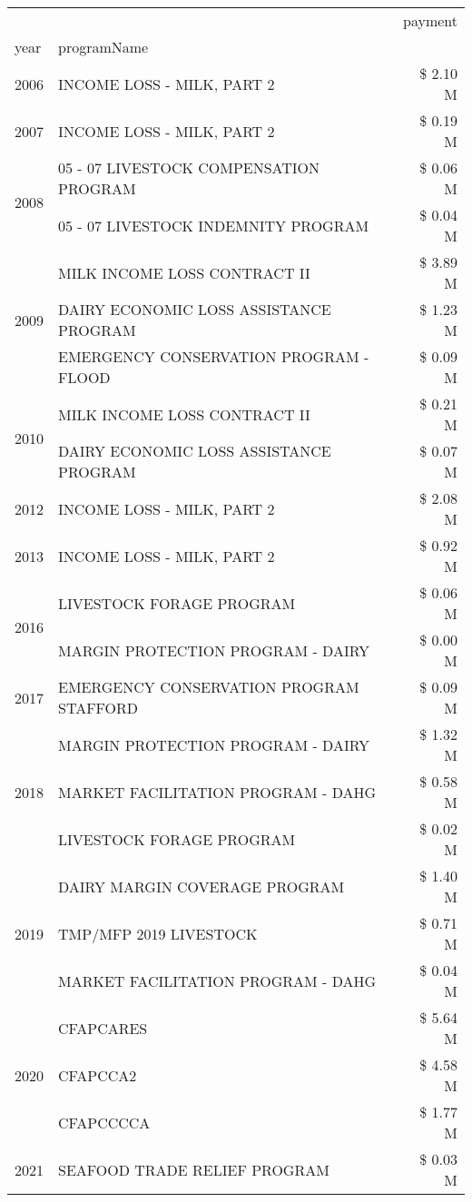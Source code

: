 \begin{tabular}{llr}
\toprule
 &  & payment \\
year & programName &  \\
\midrule
2006 & INCOME LOSS - MILK, PART 2 & \$ 2.10 M \\
\cline{1-3}
2007 & INCOME LOSS - MILK, PART 2 & \$ 0.19 M \\
\cline{1-3}
\multirow[t]{2}{*}{2008} & 05 - 07 LIVESTOCK COMPENSATION PROGRAM & \$ 0.06 M \\
 & 05 - 07 LIVESTOCK INDEMNITY PROGRAM & \$ 0.04 M \\
\cline{1-3}
\multirow[t]{3}{*}{2009} & MILK INCOME LOSS CONTRACT II & \$ 3.89 M \\
 & DAIRY ECONOMIC LOSS ASSISTANCE PROGRAM & \$ 1.23 M \\
 & EMERGENCY CONSERVATION PROGRAM - FLOOD & \$ 0.09 M \\
\cline{1-3}
\multirow[t]{2}{*}{2010} & MILK INCOME LOSS CONTRACT II & \$ 0.21 M \\
 & DAIRY ECONOMIC LOSS ASSISTANCE PROGRAM & \$ 0.07 M \\
\cline{1-3}
2012 & INCOME LOSS - MILK, PART 2 & \$ 2.08 M \\
\cline{1-3}
2013 & INCOME LOSS - MILK, PART 2 & \$ 0.92 M \\
\cline{1-3}
\multirow[t]{2}{*}{2016} & LIVESTOCK FORAGE PROGRAM & \$ 0.06 M \\
 & MARGIN PROTECTION PROGRAM - DAIRY & \$ 0.00 M \\
\cline{1-3}
2017 & EMERGENCY CONSERVATION PROGRAM STAFFORD & \$ 0.09 M \\
\cline{1-3}
\multirow[t]{3}{*}{2018} & MARGIN PROTECTION PROGRAM - DAIRY & \$ 1.32 M \\
 & MARKET FACILITATION PROGRAM - DAHG & \$ 0.58 M \\
 & LIVESTOCK FORAGE PROGRAM & \$ 0.02 M \\
\cline{1-3}
\multirow[t]{3}{*}{2019} & DAIRY MARGIN COVERAGE PROGRAM & \$ 1.40 M \\
 & TMP/MFP 2019 LIVESTOCK & \$ 0.71 M \\
 & MARKET FACILITATION PROGRAM - DAHG & \$ 0.04 M \\
\cline{1-3}
\multirow[t]{3}{*}{2020} & CFAPCARES & \$ 5.64 M \\
 & CFAPCCA2 & \$ 4.58 M \\
 & CFAPCCCCA & \$ 1.77 M \\
\cline{1-3}
2021 & SEAFOOD TRADE RELIEF PROGRAM & \$ 0.03 M \\
\cline{1-3}
\bottomrule
\end{tabular}
